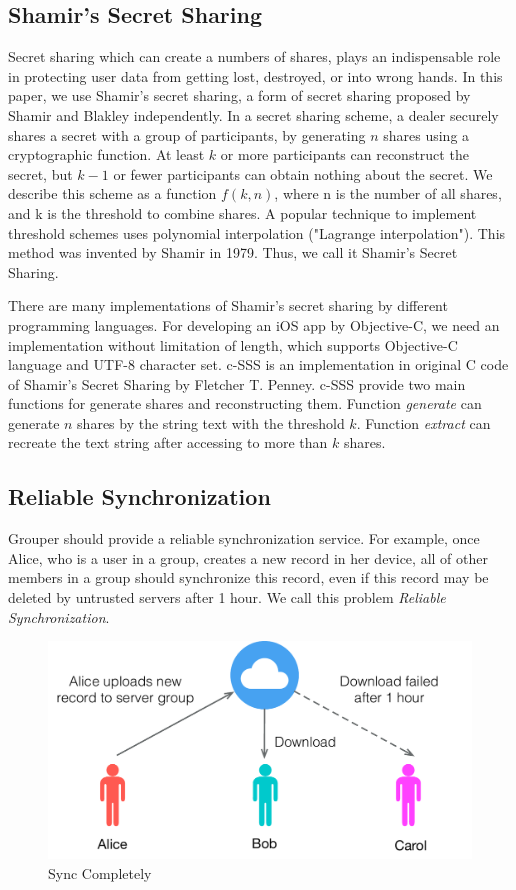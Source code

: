 \documentclass[twocolumn,10pt]{article}
\begin{document}
\subsection{Shamir's Secret Sharing}
Secret sharing which can create a numbers of shares, plays an indispensable role in protecting user data from getting lost, destroyed, or into wrong hands. In this paper, we use Shamir's secret sharing, a form of secret sharing proposed by Shamir and Blakley independently. In a secret sharing scheme, a dealer securely shares a secret with a group of participants, by generating $n$ shares using a cryptographic function\cite{smith2013layered}. At least $k$ or more participants can reconstruct the secret, but $k-1$ or fewer participants can obtain nothing about the secret\cite{pang2005new}. We describe this scheme as a function $f(k, n)$, where n is the number of all shares, and k is the threshold to combine shares. A popular technique to implement threshold schemes uses polynomial interpolation ("Lagrange interpolation"). This method was invented by Shamir in 1979. Thus, we call it Shamir's Secret Sharing.

There are many implementations of Shamir's secret sharing by different programming languages. For developing an iOS app by Objective-C, we need an implementation without limitation of length, which supports Objective-C language and UTF-8 character set. c-SSS\cite{c-sss} is an implementation in original C code of Shamir's Secret Sharing by Fletcher T. Penney. c-SSS provide two main functions for generate shares and reconstructing them. Function \emph{generate} can generate $n$ shares by the string text with the threshold $k$. Function \emph{extract} can recreate the text string after accessing to more than $k$ shares.

\subsection{Reliable Synchronization}
Grouper should provide a reliable synchronization service. For example, once Alice, who is a user in a group, creates a new record in her device, all of other members in a group should synchronize this record, even if this record may be deleted by untrusted servers after 1 hour. We call this problem \emph{Reliable Synchronization}.

\begin{figure}[t]
\centering
\includegraphics[scale=0.4]{sync_completely}
\caption{Sync Completely}
\end{figure}
\end{document}

